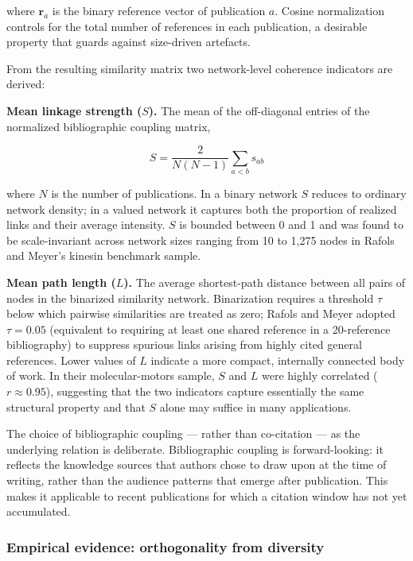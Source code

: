 \documentclass[
]{article}
\begin{document}
where \(\mathbf{r}_a\) is the binary reference vector of publication
\(a\). Cosine normalization controls for the total number of references
in each publication, a desirable property that guards against
size-driven artefacts.

From the resulting similarity matrix two network-level coherence
indicators are derived:

\textbf{Mean linkage strength (\(S\)).} The mean of the off-diagonal
entries of the normalized bibliographic coupling matrix,

\[S = \frac{2}{N(N-1)} \sum_{a < b} s_{ab}\]

where \(N\) is the number of publications. In a binary network \(S\)
reduces to ordinary network density; in a valued network it captures
both the proportion of realized links and their average intensity. \(S\)
is bounded between 0 and 1 and was found to be scale-invariant across
network sizes ranging from 10 to 1,275 nodes in Rafols and Meyer's
kinesin benchmark sample.

\textbf{Mean path length (\(L\)).} The average shortest-path distance
between all pairs of nodes in the binarized similarity network.
Binarization requires a threshold \(\tau\) below which pairwise
similarities are treated as zero; Rafols and Meyer adopted
\(\tau = 0.05\) (equivalent to requiring at least one shared reference
in a 20-reference bibliography) to suppress spurious links arising from
highly cited general references. Lower values of \(L\) indicate a more
compact, internally connected body of work. In their molecular-motors
sample, \(S\) and \(L\) were highly correlated (\(r \approx 0.95\)),
suggesting that the two indicators capture essentially the same
structural property and that \(S\) alone may suffice in many
applications.

The choice of bibliographic coupling --- rather than co-citation --- as
the underlying relation is deliberate. Bibliographic coupling is
forward-looking: it reflects the knowledge sources that authors chose to
draw upon at the time of writing, rather than the audience patterns that
emerge after publication. This makes it applicable to recent
publications for which a citation window has not yet accumulated.

\hypertarget{empirical-evidence-orthogonality-from-diversity}{%
\subsubsection{Empirical evidence: orthogonality from
diversity}\label{empirical-evidence-orthogonality-from-diversity}}
\end{document}
